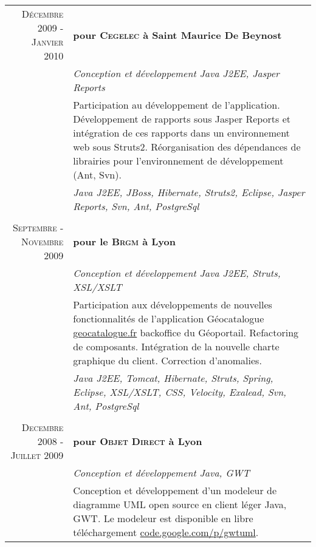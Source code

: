 \documentclass[a4paper,10pt]{article}
\begin{document}
\begin{tabular}{r|p{11cm}} 
  \textsc{Décembre 2009 - Janvier 2010}                                                              
  & \textbf{pour \textsc{Cegelec} à Saint Maurice De Beynost}                                                            \\ 
  & \emph{Conception et développement Java J2EE, Jasper Reports}                                                         \\
  & \footnotesize{Participation au développement de l'application. Développement de rapports sous Jasper Reports et intégration de ces rapports dans un environnement web sous Struts2. Réorganisation des dépendances de librairies pour l'environnement de développement (Ant, Svn).} \\
  & \emph{Java J2EE, JBoss, Hibernate, Struts2, Eclipse, Jasper Reports, Svn, Ant, PostgreSql}                           \\
  \multicolumn{2}{c}{}                                                                                                   \\
  \textsc{Septembre - Novembre 2009}
  & \textbf{pour le \textsc{Brgm} à Lyon}                                                                                \\ 
  & \emph{Conception et développement Java J2EE, Struts, XSL/XSLT}                                                       \\
  & \footnotesize{Participation aux développements de nouvelles fonctionnalités de l'application Géocatalogue \href{http://www.geocatalogue.fr}{geocatalogue.fr} backoffice du Géoportail. Refactoring de composants. Intégration de la nouvelle charte graphique du client. Correction d'anomalies.} \\
  & \emph{Java J2EE, Tomcat, Hibernate, Struts, Spring, Eclipse, XSL/XSLT, CSS, Velocity, Exalead, Svn, Ant, PostgreSql} \\
  \multicolumn{2}{c}{}                                                                                                   \\
  \textsc{Decembre 2008 - Juillet 2009}
  & \textbf{pour \textsc{Objet Direct} à Lyon}                                                                           \\
  & \emph{Conception et développement Java, GWT}                                                                         \\
  & \footnotesize{Conception et développement d’un modeleur de diagramme UML open source en client léger Java, GWT. Le modeleur est disponible en libre téléchargement \href{http://code.google.com/p/gwtuml/}{code.google.com/p/gwtuml}.} \\

\end{tabular}
\end{document}
